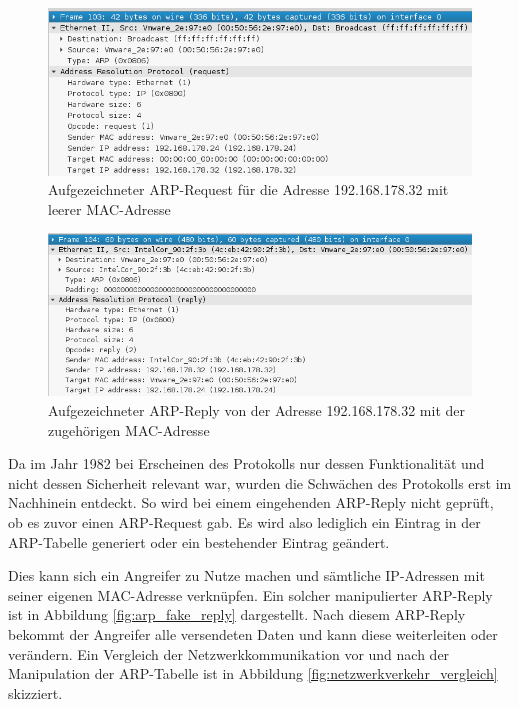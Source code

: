 \begin{figure}
	\centering
	\includegraphics[width=\textwidth]{images/ARP_Spoofing/ARP_Request}
	\caption{Aufgezeichneter ARP-Request für die Adresse 192.168.178.32 mit leerer MAC-Adresse}
	\label{fig:arp_request}
\end{figure}

\begin{figure}
	\centering
	\includegraphics[width=\textwidth]{images/ARP_Spoofing/ARP_Reply}
	\caption{Aufgezeichneter ARP-Reply von der Adresse 192.168.178.32 mit der zugehörigen MAC-Adresse}
	\label{fig:arp_reply}
\end{figure}

Da im Jahr 1982 bei Erscheinen des Protokolls nur dessen Funktionalität und nicht dessen Sicherheit relevant war, wurden die Schwächen des Protokolls erst im Nachhinein entdeckt. So wird bei einem eingehenden ARP-Reply nicht geprüft, ob es zuvor einen ARP-Request gab. Es wird also lediglich ein Eintrag in der ARP-Tabelle generiert oder ein bestehender Eintrag geändert.

Dies kann sich ein Angreifer zu Nutze machen und sämtliche IP-Adressen mit seiner eigenen MAC-Adresse verknüpfen. Ein solcher manipulierter ARP-Reply ist in Abbildung \ref{fig:arp_fake_reply} dargestellt. Nach diesem ARP-Reply bekommt der Angreifer alle versendeten Daten und kann diese weiterleiten oder verändern. Ein Vergleich der Netzwerkkommunikation vor und nach der Manipulation der ARP-Tabelle ist in Abbildung \ref{fig:netzwerkverkehr_vergleich} skizziert.

